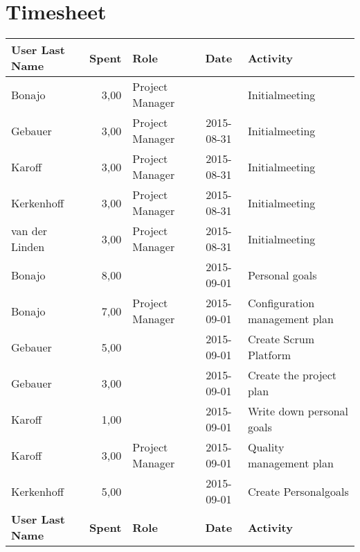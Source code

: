 \section{Timesheet}
	\renewcommand{\arraystretch}{2}
	\begin{longtable}{ l r p{2cm} c p{4cm}}
		\textbf{User Last Name} & \textbf{Spent} & \textbf{Role} & \textbf{Date} & \textbf{Activity} \\
		\hline
		Bonajo                  & 3,00           & Project Manager & \printdate{2015-08-31}    & Initialmeeting                                  \\
		Gebauer                 & 3,00           & Project Manager & 2015-08-31    & Initialmeeting                                  \\
		Karoff                  & 3,00           & Project Manager & 2015-08-31    & Initialmeeting                                  \\
		Kerkenhoff              & 3,00           & Project Manager & 2015-08-31    & Initialmeeting                                  \\
		van der Linden          & 3,00           & Project Manager & 2015-08-31    & Initialmeeting                                  \\
		Bonajo                  & 8,00           &                 & 2015-09-01    & Personal goals                                  \\
		Bonajo                  & 7,00           & Project Manager & 2015-09-01    & Configuration management plan                   \\
		Gebauer                 & 5,00           &                 & 2015-09-01    & Create Scrum Platform                           \\
		Gebauer                 & 3,00           &                 & 2015-09-01    & Create the project plan                         \\
		Karoff                  & 1,00           &                 & 2015-09-01    & Write down personal goals                       \\
		Karoff                  & 3,00           & Project Manager & 2015-09-01    & Quality management plan                         \\
		Kerkenhoff              & 5,00           &                 & 2015-09-01    & Create Personalgoals                            \\
		\textbf{User Last Name} & \textbf{Spent} & \textbf{Role} & \textbf{Date} & \textbf{Activity} \\

\end{longtable}
